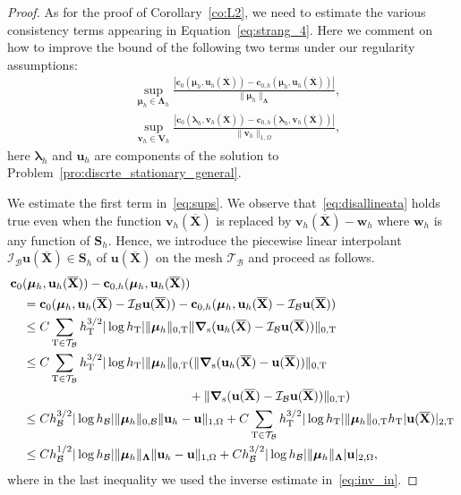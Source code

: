 \documentclass[oneside]{amsart} %
\newcommand\II{\mathcal{I}}
\DeclareMathOperator{\grads}{\boldsymbol\nabla_s}
\newcommand\B{\mathcal B} %
\renewcommand\u{\mathbf{u}} %
\renewcommand\v{\mathbf{v}} %
\renewcommand\c{\mathbf{c}} %
\newcommand\w{\mathbf{w}} %
\renewcommand\S{\mathbf{S}} %
\newcommand\X{\mathbf{X}} %
\newcommand\Xbar{\overline{\X}} %
\newcommand\LL{{\boldsymbol{\Lambda}}} %
\newcommand\Vline{\mathbf{V}} %
\newcommand\llambda{\boldsymbol\lambda} %
\newcommand\mmu{{\boldsymbol\mu}} %
\newcommand\T{\mathcal{T}} %
\newcommand\tri{\mathrm{T}} %
\newcommand\fc{\begin{color}{magenta}}
\newcommand\cf{\end{color}}
\begin{document}
	\begin{proof}
		
		As for the proof of Corollary~\ref{co:L2}, we need to estimate the various
		consistency terms appearing in Equation~\eqref{eq:strang_4}. Here we comment
		on how to improve the bound of the following two terms under our regularity
		assumptions:
		\begin{equation}\label{eq:sups}
			\begin{aligned}
				&\sup_{\mmu_h\in\LL_h}\frac{|\c_0(\mmu_h,\u_h(\Xbar))-\c_{0,h}(\mmu_h,\u_h(\Xbar))|}{\|\mmu_h\|_{\LL}},\\
				&\sup_{\v_h\in\Vline_h}\frac{|\c_0(\llambda_h,\v_h(\Xbar))-\c_{0,h}(\llambda_h,\v_h(\Xbar))|} {\|\v_h\|_{1,\Omega}},
			\end{aligned}
		\end{equation}
		here $\llambda_h$ and $\u_h$ are components of the solution to
		Problem~\ref{pro:discrte_stationary_general}.
		
		We estimate the first term in~\eqref{eq:sups}. 
		We observe that~\eqref{eq:disallineata} holds true even when the function
		$\v_h(\Xbar)$ is replaced by $\v_h(\Xbar)-\w_h$ where $\w_h$ is any function
		of $\S_h$.
		Hence, we introduce the piecewise linear interpolant $\II_\B\u(\Xbar)\in\S_h$
		of $\u(\Xbar)$ on the mesh $\T_\B$ and proceed as follows.
		\[
		\aligned
		&\c_0(\mmu_h,\u_h(\Xbar))-\c_{0,h}(\mmu_h,\u_h(\Xbar))\\
		&\quad=\c_0(\mmu_h,\u_h(\Xbar)-\II_\B\u(\Xbar))
		-\c_{0,h}(\mmu_h,\u_h(\Xbar)-\II_\B\u(\Xbar))\\
		&\quad\le C\sum_{\tri\in\T_\B}h^{3/2}_\tri{|\log h_\tri|}
		\|\mmu_h\|_{0,\tri}\|{\grads(\u_h(\Xbar)-\II_\B\u(\Xbar))}\|_{0,\tri}\\
		&\quad\le C\sum_{\tri\in\T_\B}h^{3/2}_\tri{|\log h_\tri|}
		\|\mmu_h\|_{0,\tri}(\|{\grads(\u_h(\Xbar)-\u(\Xbar))}\|_{0,\tri}\\
		&{\hspace{5cm}}+\|{\grads(\u(\Xbar)-\II_\B\u(\Xbar))}\|_{0,\tri})\\
		&\quad\le Ch^{3/2}_\B{|\log h_\B|}\|\mmu_h\|_{0,\B}\|\u_h-\u\|_{1,\Omega}
		+C\sum_{\tri\in\T_\B}h^{3/2}_\tri{|\log h_\tri|}\|\mmu_h\|_{0,\tri}h_\tri|\u(\Xbar)|_{2,\tri}\\
		&\quad\le Ch^{1/2}_\B{|\log h_\B|}\|\mmu_h\|_\LL\|\u_h-\u\|_{1,\Omega}
		+Ch^{3/2}_\B{|\log h_\B|}\|\mmu_h\|_\LL|\u|_{2,\Omega},
		\endaligned
		\]
		where in the last inequality we used the inverse estimate
		in~\eqref{eq:inv_in}.
		

\end{proof}
\end{document}
